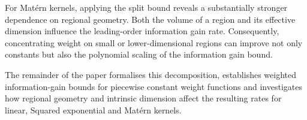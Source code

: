 \begin{proposition*}
For Mat\'ern kernels, applying the split bound reveals a substantially stronger dependence on regional geometry. Both the volume of a region and its effective dimension influence the leading-order information gain rate. Consequently, concentrating weight on small or lower-dimensional regions can improve not only constants but also the polynomial scaling of the information gain bound.
\end{proposition*}

The remainder of the paper formalises this decomposition, establishes weighted information-gain bounds for piecewise constant weight functions and investigates how regional geometry and intrinsic dimension affect the resulting rates for linear, Squared exponential and Matérn kernels.

